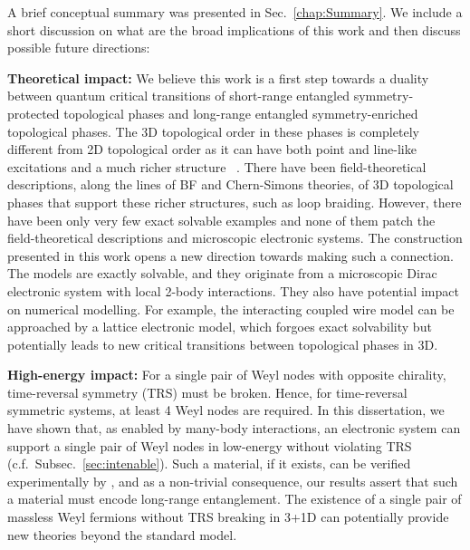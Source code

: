 A brief conceptual summary was presented in Sec.~\ref{chap:Summary}. We include a short discussion on what are the broad implications of this work and then discuss possible future directions:

\textbf{Theoretical impact:} We believe this work is a first step towards a duality between quantum critical transitions of short-range entangled symmetry-protected topological phases and long-range entangled symmetry-enriched topological phases. The 3D topological order in these phases is completely different from 2D topological order as it can have both point and line-like excitations and a much richer structure ~\cite{SirotaRazaTeoappearsoon}. There have been field-theoretical descriptions, along the lines of BF and Chern-Simons theories, of 3D topological phases that support these richer structures, such as loop braiding. However, there have been only very few exact solvable examples and none of them patch the field-theoretical descriptions and microscopic electronic systems. The construction presented in this work opens a new direction towards making such a connection. The models are exactly solvable, and they originate from a microscopic Dirac electronic system with local 2-body interactions. They also have potential impact on numerical modelling. For example, the interacting coupled wire model can be approached by a lattice electronic model, which forgoes exact solvability but potentially leads to new critical transitions between topological phases in 3D.

\textbf{High-energy impact:} For a single pair of Weyl nodes with opposite chirality, time-reversal symmetry (TRS) must be broken. Hence, for time-reversal symmetric systems, at least 4 Weyl nodes are required. In this dissertation, we have shown that, as enabled by many-body interactions, an electronic system can support a single pair of Weyl nodes in low-energy without violating TRS (c.f.~Subsec.~\ref{sec:intenable}). Such a material, if it exists, can be verified experimentally by \ARPES, and as a non-trivial consequence, our results assert that such a material must encode long-range entanglement. The existence of a single pair of massless Weyl fermions without TRS breaking in 3+1D can potentially provide new theories beyond the standard model.

